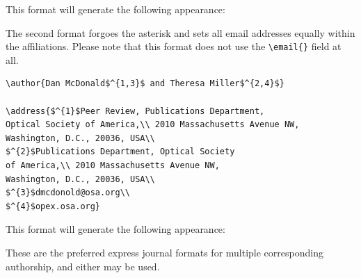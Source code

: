 \documentclass[10pt,letterpaper]{article}
\begin{document}
This format will generate the following appearance:

\author{Dan McDonald$^{1,3}$ and Theresa Miller$^{2,*}$}

\address{$^{1}$Peer Review, Publications Department, Optical Society of America,\\ 2010 Massachusetts Avenue NW, Washington, D.C., 20036, USA\\
$^{2}$Publications Department, Optical Society of America,\\ 2010 Massachusetts Avenue NW, Washington, D.C., 20036, USA\\
$^{3}$dmcdonold@osa.org}


The second format forgoes the asterisk and sets all email addresses equally within the affiliations. Please note that this format does not use the \verb+\email{}+ field at all.
\begin{verbatim}
\author{Dan McDonald$^{1,3}$ and Theresa Miller$^{2,4}$}

\address{$^{1}$Peer Review, Publications Department,
Optical Society of America,\\ 2010 Massachusetts Avenue NW,
Washington, D.C., 20036, USA\\
$^{2}$Publications Department, Optical Society
of America,\\ 2010 Massachusetts Avenue NW,
Washington, D.C., 20036, USA\\
$^{3}$dmcdonold@osa.org\\
$^{4}$opex.osa.org}
\end{verbatim}

This format will generate the following appearance:

\author{Dan McDonald$^{1,3}$ and Theresa Miller$^{2,4}$}

\address{$^{1}$Peer Review, Publications Department, Optical Society of America,\\ 2010 Massachusetts Avenue NW, Washington, D.C., 20036, USA\\
$^{2}$Publications Department, Optical Society of America,\\ 2010 Massachusetts Avenue NW, Washington, D.C., 20036, USA\\
$^{3}$dmcdonold@osa.org\\
$^{4}$opex.osa.org}

These are the preferred express journal formats for multiple corresponding authorship, and either may be used.
\end{document}
